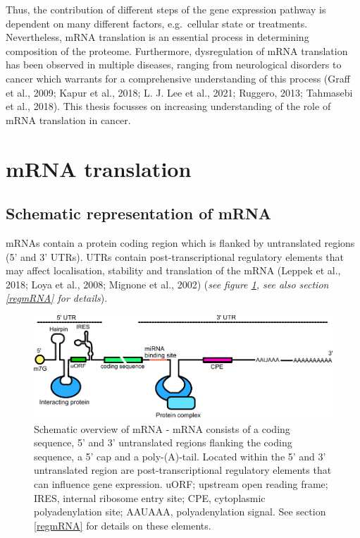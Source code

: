 \documentclass[
  12pt,
  openany]{book}
\begin{document}
Thus, the contribution of different steps of the gene expression pathway is dependent on many different factors, e.g.~cellular state or treatments. Nevertheless, mRNA translation is an essential process in determining composition of the proteome. Furthermore, dysregulation of mRNA translation has been observed in multiple diseases, ranging from neurological disorders to cancer which warrants for a comprehensive understanding of this process (Graff et al., 2009; Kapur et al., 2018; L. J. Lee et al., 2021; Ruggero, 2013; Tahmasebi et al., 2018). This thesis focusses on increasing understanding of the role of mRNA translation in cancer.
\newline

\section{mRNA translation}
\subsection{Schematic representation of mRNA}

mRNAs contain a protein coding region which is flanked by untranslated regions (5' and 3' UTRs). UTRs contain post-transcriptional regulatory elements that may affect localisation, stability and translation of the mRNA (Leppek et al., 2018; Loya et al., 2008; Mignone et al., 2002) (\emph{see figure \ref{fig:UTRFeat}, see also section \ref{regmRNA} for details}).

\begin{figure}[H]
  \includegraphics{./figures/UTRFeatures_2.pdf}
  \caption{ Schematic overview of mRNA - mRNA consists of a coding sequence, 5' and 3' untranslated regions flanking the coding sequence, a 5' cap and a poly-(A)-tail. Located within the 5' and 3' untranslated region are post-transcriptional regulatory elements that can influence gene expression. uORF; upstream open reading frame; IRES, internal ribosome entry site; CPE, cytoplasmic polyadenylation site; AAUAAA, polyadenylation signal. See section \ref{regmRNA} for details on these elements.
 \label{fig:UTRFeat}}
\end{figure}
\end{document}
